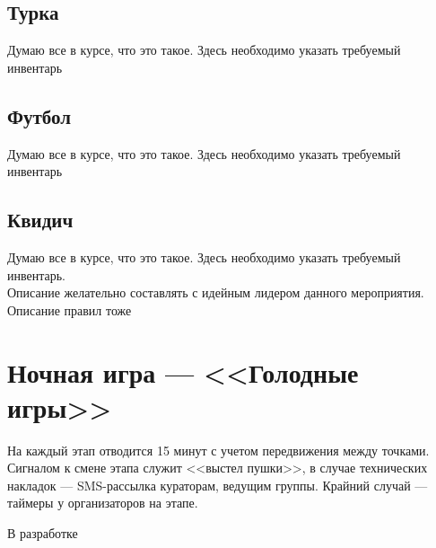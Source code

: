 \documentclass[a4paper, 14pt]{extarticle}
\theoremstyle{definition}
\begin{document}
{}
\subsection*{Турка}

Думаю все в курсе, что это такое. Здесь необходимо указать требуемый инвентарь

{}
\subsection*{Футбол}

Думаю все в курсе, что это такое. Здесь необходимо указать требуемый инвентарь

{}
\subsection*{Квидич}

Думаю все в курсе, что это такое. Здесь необходимо указать требуемый инвентарь.\\
Описание желательно составлять с идейным лидером данного мероприятия.\\
Описание правил тоже


\cleardoublepage
{}
{}
\section*{Ночная игра --- <<Голодные игры>>}

\par На каждый этап отводится 15 минут с учетом передвижения между точками. Сигналом к смене этапа служит <<выстел пушки>>, в случае технических накладок --- SMS-рассылка кураторам, ведущим группы. Крайний случай --- таймеры у организаторов на этапе.
\par В разработке
\end{document}
